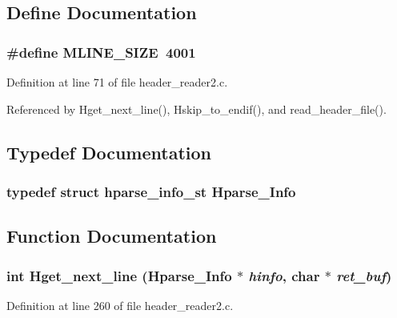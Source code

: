 \subsection{Define Documentation}
\subsubsection{\setlength{\rightskip}{0pt plus 5cm}\#define MLINE\_\-SIZE~4001}\label{header__reader2_8c_4253cac11fcc1fba152b18205cc28a91}




Definition at line 71 of file header\_\-reader2.c.

Referenced by Hget\_\-next\_\-line(), Hskip\_\-to\_\-endif(), and read\_\-header\_\-file().

\subsection{Typedef Documentation}
\subsubsection{\setlength{\rightskip}{0pt plus 5cm}typedef struct \bf{hparse\_\-info\_\-st}
 \bf{Hparse\_\-Info}}\label{header__reader2_8c_1c7a4795de9ad80203df10f8f5b59d98}




\subsection{Function Documentation}
\subsubsection{\setlength{\rightskip}{0pt plus 5cm}int Hget\_\-next\_\-line (\bf{Hparse\_\-Info} $\ast$ {\em hinfo}, char $\ast$ {\em ret\_\-buf})}\label{header__reader2_8c_a8f0c95c6f82b49624faba4e34616dd6}




Definition at line 260 of file header\_\-reader2.c.

